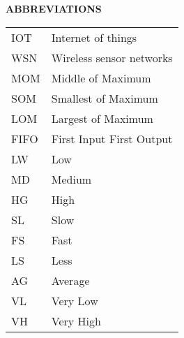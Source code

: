 \begin{center}
{\large\bf ABBREVIATIONS}
\end{center}
\begin{table}[h!]
\begin{tabular}{p{2cm}p{8cm}}
IOT & Internet of things\\
WSN &  Wireless sensor networks\\
MOM & Middle of Maximum \\
SOM & Smallest of Maximum \\
LOM & Largest of Maximum \\
FIFO & First Input First Output \\
LW & Low \\
MD & Medium \\
HG & High \\
SL & Slow \\
FS & Fast \\
LS & Less \\
AG & Average \\
VL & Very Low \\
VH & Very High \\
\end{tabular}
\end{table}

